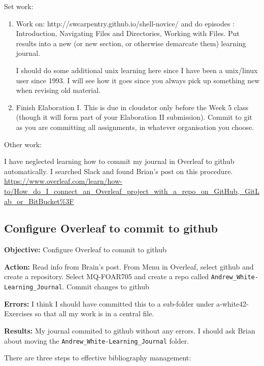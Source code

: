 \documentclass[a4paper,11pt]{article}
\begin{document}
Set work:
\begin{enumerate}
    \item Work on: http://swcarpentry.github.io/shell-novice/ and do episodes : Introduction, Navigating Files and Directories, Working with Files. Put results into a new (or new section, or otherwise demarcate them) learning journal.
    
    I should do some additional unix learning here since I have been a unix/linux user since 1993. I will see how it goes since you always pick up something new when revising old material. 
    
    \item Finish Elaboration I. This is due in cloudstor only before the Week 5 class (though it will form part of your Elaboration II submission). Commit to git as you are committing all assignments, in whatever organisation you choose. 

\end{enumerate}

Other work:

I have neglected learning how to commit my journal in Overleaf to github automatically. I searched Slack and found Brian's post on this procedure.\\

\url{https://www.overleaf.com/learn/how-to/How_do_I_connect_an_Overleaf_project_with_a_repo_on_GitHub,_GitLab_or_BitBucket%3F}\\

\subsection{Configure Overleaf to commit to github}

\textbf{Objective:} Configure Overleaf to commit to github

\textbf{Action:} Read info from Brain's post. From Menu in Overleaf, select github and create a repository. Select MQ-FOAR705 and create a repo called \verb|Andrew_White-Learning_Journal|. Commit changes to github

\textbf{Errors:} I think I should have committed this to a sub-folder under a-white42-Exercises so that all my work is in a central file. 

\textbf{Results:} My journal commited to github without any errors. I should ask Brian about moving the \verb|Andrew_White-Learning_Journal| folder.



There are three steps to effective bibliography management:
\end{document}
